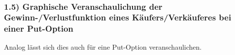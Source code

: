 \documentclass[paper=landscape]{scrartcl}
\begin{document}
    \begin{center}
    \end{center}
    { \hspace*{\fill} \\}
    
    \hypertarget{graphische-veranschaulichung-der-gewinn-verlustfunktion-eines-kuxe4ufersverkuxe4uferes-bei-einer-put-option}{%
\subsubsection{1.5) Graphische Veranschaulichung der
Gewinn-/Verlustfunktion eines Käufers/Verkäuferes bei einer
Put-Option}\label{graphische-veranschaulichung-der-gewinn-verlustfunktion-eines-kuxe4ufersverkuxe4uferes-bei-einer-put-option}}

Analog lässt sich dies auch für eine Put-Option veranschaulichen.
\end{document}
